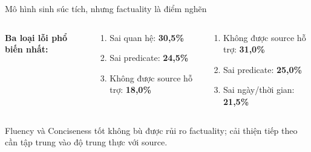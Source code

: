 \documentclass[aspectratio=169,10pt]{beamer}
\newcommand{\tightitems}{\setlength{\itemsep}{2.0pt}\setlength{\parskip}{0pt}}
\begin{document}
\begin{frame}{Mô hình sinh súc tích, nhưng factuality là điểm nghẽn}
\begin{columns}[T,onlytextwidth]
      \textbf{Ba loại lỗi phổ biến nhất:}
      \vspace{1mm}
      \begin{tcolorbox}[
        title=Scratch Transformer,
        colback=SoftBlue,colframe=DeepBlue,
        colbacktitle=DeepBlue,coltitle=white,
        fonttitle=\bfseries,
        left=1mm,right=1mm,top=0.7mm,bottom=0.7mm]
        \scriptsize
        \begin{enumerate}\tightitems
          \item Sai quan hệ: \textbf{30,5\%}
          \item Sai predicate: \textbf{24,5\%}
          \item Không được source hỗ trợ: \textbf{18,0\%}
        \end{enumerate}
      \end{tcolorbox}
      \vspace{1mm}
      \begin{tcolorbox}[
        title=ViT5-Base,
        colback=white,colframe=VitPurple,
        colbacktitle=VitPurple,coltitle=white,
        fonttitle=\bfseries,
        left=1mm,right=1mm,top=0.7mm,bottom=0.7mm]
        \scriptsize
        \begin{enumerate}\tightitems
          \item Không được source hỗ trợ: \textbf{31,0\%}
          \item Sai predicate: \textbf{25,0\%}
          \item Sai ngày/thời gian: \textbf{21,5\%}
        \end{enumerate}
      \end{tcolorbox}
  \end{columns}

  \vspace{0.6mm}
  \begin{keymessage}
    \scriptsize Fluency và Conciseness tốt không bù được rủi ro factuality; cải thiện tiếp theo cần tập trung vào độ trung thực với source.
  \end{keymessage}
\end{frame}
\end{document}
